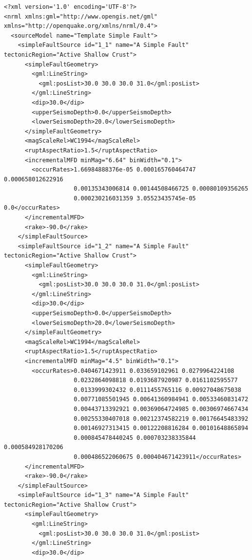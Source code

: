 \begin{Verbatim}[frame=single, commandchars=\\\{\}, fontsize=\scriptsize]
<?xml version='1.0' encoding='UTF-8'?>
<nrml xmlns:gml="http://www.opengis.net/gml" xmlns="http://openquake.org/xmlns/nrml/0.4">
  <sourceModel name="Template Simple Fault">
    <simpleFaultSource id="1_1" name="A Simple Fault" tectonicRegion="Active Shallow Crust">
      <simpleFaultGeometry>
        <gml:LineString>
          <gml:posList>30.0 30.0 30.0 31.0</gml:posList>
        </gml:LineString>
        <dip>30.0</dip>
        <upperSeismoDepth>0.0</upperSeismoDepth>
        <lowerSeismoDepth>20.0</lowerSeismoDepth>
      </simpleFaultGeometry>
      <magScaleRel>WC1994</magScaleRel>
      <ruptAspectRatio>1.5</ruptAspectRatio>
      <incrementalMFD minMag="6.64" binWidth="0.1">
        <occurRates>1.66984888376e-05 0.000165760464747 0.000658012622916 
                    0.00135343006814 0.00144508466725 0.00080109356265 
                    0.000230216031359 3.05523435745e-05 0.0</occurRates>
      </incrementalMFD>
      <rake>-90.0</rake>
    </simpleFaultSource>
    <simpleFaultSource id="1_2" name="A Simple Fault" tectonicRegion="Active Shallow Crust">
      <simpleFaultGeometry>
        <gml:LineString>
          <gml:posList>30.0 30.0 30.0 31.0</gml:posList>
        </gml:LineString>
        <dip>30.0</dip>
        <upperSeismoDepth>0.0</upperSeismoDepth>
        <lowerSeismoDepth>20.0</lowerSeismoDepth>
      </simpleFaultGeometry>
      <magScaleRel>WC1994</magScaleRel>
      <ruptAspectRatio>1.5</ruptAspectRatio>
      <incrementalMFD minMag="4.5" binWidth="0.1">
        <occurRates>0.0404671423911 0.033659102961 0.0279964224108 
                    0.0232864098818 0.0193687920987 0.0161102595577 
                    0.0133999302432 0.0111455765116 0.00927048675038
                    0.00771085501945 0.00641360984941 0.00533460831472
                    0.00443713392921 0.00369064724985 0.00306974667434
                    0.00255330407018 0.00212374582219 0.00176645483392
                    0.00146927313415 0.00122208816284 0.00101648865894
                    0.000845478440245 0.000703238335844 0.000584928170206
                    0.000486522060675 0.000404671423911</occurRates>
      </incrementalMFD>
      <rake>-90.0</rake>
    </simpleFaultSource>
    <simpleFaultSource id="1_3" name="A Simple Fault" tectonicRegion="Active Shallow Crust">
      <simpleFaultGeometry>
        <gml:LineString>
          <gml:posList>30.0 30.0 30.0 31.0</gml:posList>
        </gml:LineString>
        <dip>30.0</dip>

\end{Verbatim}
